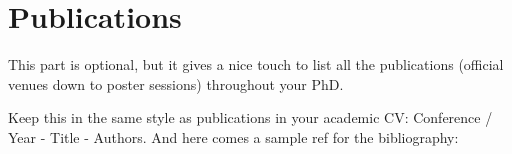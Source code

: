 \chapter*{\rm\bfseries Publications}
\label{ch:publications}

This part is optional, but it gives a nice touch to list all the publications (official venues down to poster sessions) throughout your PhD.

Keep this in the same style as publications in your academic CV: 
Conference / Year - Title - Authors. And here comes a sample ref for the bibliography: \cite{schiedermeier_fiddlr_2021}

